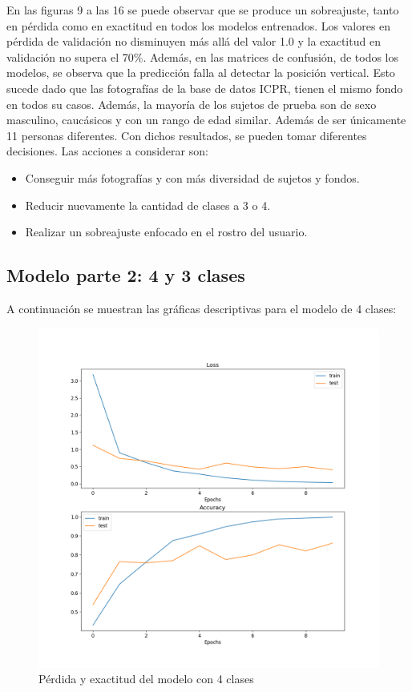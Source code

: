 En las figuras 9 a las 16 se puede observar que se produce un sobreajuste, tanto en pérdida como en exactitud en todos los modelos entrenados. Los valores en pérdida de validación no disminuyen más allá del valor 1.0 y la exactitud en validación no supera el 70\%. Además, en las matrices de confusión, de todos los modelos, se observa que la predicción falla al detectar la posición vertical. Esto sucede dado que las fotografías de la base de datos ICPR, tienen el mismo fondo en todos su casos. Además, la mayoría de los sujetos de prueba son de sexo masculino, caucásicos y con un rango de edad similar. Además de ser únicamente 11 personas diferentes. Con dichos resultados, se pueden tomar diferentes decisiones. Las acciones a considerar son: 

\begin{itemize}
	\item Conseguir más fotografías y con más diversidad de sujetos y fondos.
	\item Reducir nuevamente la cantidad de clases a 3 o 4. 
	\item Realizar un sobreajuste enfocado en el rostro del usuario.
\end{itemize}

\subsection{Modelo parte 2: 4 y 3 clases}

A continuación se muestran las gráficas descriptivas para el modelo de 4 clases:

\begin{figure}[H]
	\centering
	\includegraphics[scale=0.65]{figures/LA4.png}
	\caption{Pérdida y exactitud del modelo con 4 clases}
	\label{fig:img17}
\end{figure}

